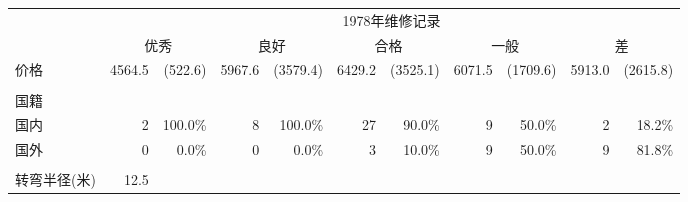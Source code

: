 \begin{tabular}{lllllllllll}
\cline{1-11}
\multicolumn{1}{c}{} &
  \multicolumn{10}{c}{1978年维修记录} \\
\multicolumn{1}{c}{} &
  \multicolumn{2}{c}{优秀} &
  \multicolumn{2}{c}{良好} &
  \multicolumn{2}{c}{合格} &
  \multicolumn{2}{c}{一般} &
  \multicolumn{2}{c}{差} \\
\cline{1-11}
\multicolumn{1}{l}{价格} &
  \multicolumn{1}{r}{4564.5} &
  \multicolumn{1}{r}{(522.6)} &
  \multicolumn{1}{r}{5967.6} &
  \multicolumn{1}{r}{(3579.4)} &
  \multicolumn{1}{r}{6429.2} &
  \multicolumn{1}{r}{(3525.1)} &
  \multicolumn{1}{r}{6071.5} &
  \multicolumn{1}{r}{(1709.6)} &
  \multicolumn{1}{r}{5913.0} &
  \multicolumn{1}{r}{(2615.8)} \\
\multicolumn{1}{l}{} &
  \multicolumn{1}{r}{} &
  \multicolumn{1}{r}{} &
  \multicolumn{1}{r}{} &
  \multicolumn{1}{r}{} &
  \multicolumn{1}{r}{} &
  \multicolumn{1}{r}{} &
  \multicolumn{1}{r}{} &
  \multicolumn{1}{r}{} &
  \multicolumn{1}{r}{} &
  \multicolumn{1}{r}{} \\
\multicolumn{1}{l}{国籍} &
  \multicolumn{1}{r}{} &
  \multicolumn{1}{r}{} &
  \multicolumn{1}{r}{} &
  \multicolumn{1}{r}{} &
  \multicolumn{1}{r}{} &
  \multicolumn{1}{r}{} &
  \multicolumn{1}{r}{} &
  \multicolumn{1}{r}{} &
  \multicolumn{1}{r}{} &
  \multicolumn{1}{r}{} \\
\multicolumn{1}{l}{\hspace{1em}国内} &
  \multicolumn{1}{r}{2} &
  \multicolumn{1}{r}{100.0\%} &
  \multicolumn{1}{r}{8} &
  \multicolumn{1}{r}{100.0\%} &
  \multicolumn{1}{r}{27} &
  \multicolumn{1}{r}{90.0\%} &
  \multicolumn{1}{r}{9} &
  \multicolumn{1}{r}{50.0\%} &
  \multicolumn{1}{r}{2} &
  \multicolumn{1}{r}{18.2\%} \\
\multicolumn{1}{l}{\hspace{1em}国外} &
  \multicolumn{1}{r}{0} &
  \multicolumn{1}{r}{0.0\%} &
  \multicolumn{1}{r}{0} &
  \multicolumn{1}{r}{0.0\%} &
  \multicolumn{1}{r}{3} &
  \multicolumn{1}{r}{10.0\%} &
  \multicolumn{1}{r}{9} &
  \multicolumn{1}{r}{50.0\%} &
  \multicolumn{1}{r}{9} &
  \multicolumn{1}{r}{81.8\%} \\
\multicolumn{1}{l}{} &
  \multicolumn{1}{r}{} &
  \multicolumn{1}{r}{} &
  \multicolumn{1}{r}{} &
  \multicolumn{1}{r}{} &
  \multicolumn{1}{r}{} &
  \multicolumn{1}{r}{} &
  \multicolumn{1}{r}{} &
  \multicolumn{1}{r}{} &
  \multicolumn{1}{r}{} &
  \multicolumn{1}{r}{} \\
\multicolumn{1}{l}{转弯半径(米)} &
  \multicolumn{1}{r}{12.5} &

\end{tabular}
